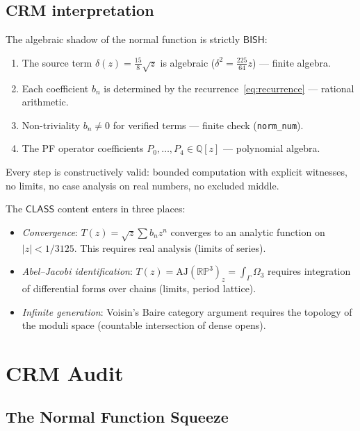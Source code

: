 \documentclass[11pt]{article}
\theoremstyle{plain}
\theoremstyle{definition}
\theoremstyle{remark}
\newcommand{\Q}{\mathbb{Q}}
\newcommand{\R}{\mathbb{R}}
\newcommand{\PP}{\mathbb{P}}
\newcommand{\AJ}{\mathrm{AJ}}
\newcommand{\BISH}{\ensuremath{\mathsf{BISH}}}
\newcommand{\CLASS}{\ensuremath{\mathsf{CLASS}}}
\begin{document}
\subsection{CRM interpretation}

The algebraic shadow of the normal function is strictly $\BISH$:
\begin{enumerate}[nosep]
\item The source term $\delta(z) = \tfrac{15}{8}\sqrt{z}$ is algebraic ($\delta^2 = \tfrac{225}{64}z$) --- finite algebra.
\item Each coefficient $b_n$ is determined by the recurrence~\eqref{eq:recurrence} --- rational arithmetic.
\item Non-triviality $b_n \neq 0$ for verified terms --- finite check (\texttt{norm\_num}).
\item The PF operator coefficients $P_0,\ldots,P_4 \in \Q[z]$ --- polynomial algebra.
\end{enumerate}
Every step is constructively valid: bounded computation with explicit witnesses, no limits, no case analysis on real numbers, no excluded middle.

The $\CLASS$ content enters in three places:
\begin{itemize}[nosep]
\item \emph{Convergence}: $T(z) = \sqrt{z}\sum b_n z^n$ converges to an analytic function on $|z| < 1/3125$. This requires real analysis (limits of series).
\item \emph{Abel--Jacobi identification}: $T(z) = \AJ(\R\PP^3)_z = \int_\Gamma \Omega_3$ requires integration of differential forms over chains (limits, period lattice).
\item \emph{Infinite generation}: Voisin's Baire category argument requires the topology of the moduli space (countable intersection of dense opens).
\end{itemize}


\section{CRM Audit}
\label{sec:crm}

\subsection{The Normal Function Squeeze}
\end{document}
